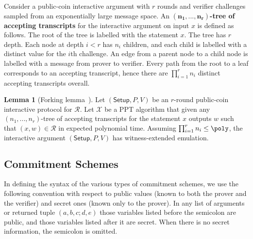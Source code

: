 \documentclass{article}
\theoremstyle{definition}
\newtheorem{lemma}{Lemma}
\begin{document}
Consider a public-coin interactive argument with $r$ rounds and verifier challenges sampled from an exponentially large message space. An \textbf{$\mathbf{(n_1,...,n_r)}$-tree of accepting transcripts} for the interactive argument on input $x$ is defined as follows. The root of the tree is labelled with the statement $x$. The tree has $r$ depth. Each node at depth $i < r$ has $n_i$ children, and each child is labelled with a distinct value for the $i$th challenge. An edge from a parent node to a child node is labelled with a message from prover to verifier. Every path from the root to a leaf corresponds to an accepting transcript, hence there are $\prod_{i=1}^r n_i$ distinct accepting transcripts overall. 

\begin{lemma}[Forking lemma~\cite{EC:BCCGP16}] 
Let $(\textsf{Setup}, P, V)$ be an $r$-round public-coin interactive protocol for $\mathcal{R}$. Let $\mathcal{X}$ be a PPT algorithm that given any $(n_1,...,n_r)$-tree of accepting transcripts for the statement $x$ outputs $w$ such that $(x, w) \in \mathcal{R}$ in expected polynomial time. Assuming $\prod_{i=1}^r n_i \leq \poly$, the interactive argument $(\textsf{Setup}, P, V)$ has witness-extended emulation. 
\end{lemma}

\subsection{Commitment Schemes}

In defining the syntax of the various types of commitment schemes, we use the following convention with respect to public values (known to both the prover and the verifier) and secret ones (known only to the prover). In any list of arguments or returned tuple $(a, b, c; d, e)$ those variables listed before the semicolon are public, and those variables listed after it are secret. When there is no secret information, the semicolon is omitted.
\end{document}

